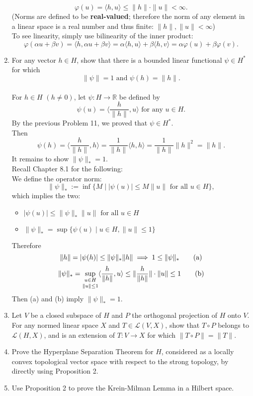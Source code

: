\begin{enumerate}
    \[
        \varphi(u)=\langle h,u\rangle\le\|h\|\cdot\|u\|<\infty.
    \]
    (Norms are defined to be \textbf{real-valued}; therefore the norm of any element in a linear space is a real number and thus finite: $\|h\|,\|u\|<\infty$)
    \\To see linearity, simply use bilinearity of the inner product:
    \[
        \varphi(\alpha u+\beta v)=\langle h,\alpha u+\beta v\rangle=\alpha\langle h,u\rangle+\beta\langle h,v\rangle=\alpha\varphi(u)+\beta\varphi(v).
    \]
    \item For any vector $h\in H$, show that there is a bounded linear functional $\psi\in H^*$ for which 
    \[
        \|\psi\|=1\text{ and }\psi(h)=\|h\|.  
    \]
    \\For $h\in H$ $(h\neq0)$, let $\psi:H\to\mathbb{R}$ be defined by 
    \[
        \psi(u)=\langle \frac{h}{\|h\|},u\rangle\text{ for any }u\in H.
    \]
    By the previous Problem 11, we proved that $\psi\in H^*$.
    \\Then 
    \[
        \psi(h)=\langle \frac{h}{\|h\|},h\rangle=\frac{1}{\|h\|}\langle h,h\rangle=\frac{1}{\|h\|}\|h\|^2=\|h\|.
    \]
    It remains to show $\|\psi\|_*=1$.
    \\Recall Chapter 8.1 for the following:
    \\We define the operator norm:
    \[
        \|\psi\|_*:=\inf\{M\mid|\psi(u)|\le M\|u\|\text{ for all }u\in H\},
    \]
    which implies the two: 
    \begin{itemize}
        \item $|\psi(u)|\le \|\psi\|_*\|u\|\text{ for all }u\in H$
        \item $\|\psi\|_*=\sup\{\psi(u)\mid u\in H, \|u\|\le1\}$
    \end{itemize}
    Therefore
    \[
        \|h\|=|\psi(h)|\le \|\psi\|_*\|h\|\implies 1\le \|\psi\|_*\tag{\text{a}}
    \]
    \[
        \|\psi\|_*=\underset{\|u\|\le1}{\underset{u\in H}{\sup}}\langle \frac{h}{\|h\|},u\rangle\le \|\frac{h}{\|h\|}\|\cdot\|u\|\le1\tag{\text{b}}
    \]
    Then (a) and (b) imply $\|\psi\|_*=1$.
    \item Let $V$ be a closed subspace of $H$ and $P$ the orthogonal projection of $H$ onto $V$.
    For any normed linear space $X$ and $T\in\mathcal{L}(V,X)$, show that $T\circ P$ belongs to $\mathcal{L}(H,X)$, and is an extension of $T:V\to X$ for which $\|T\circ P\|=\|T\|$.
    \item Prove the Hyperplane Separation Theorem for $H$, considered as a locally convex topological vector space with respect to the strong topology, by directly using Proposition 2.
    \item Use Proposition 2 to prove the Krein-Milman Lemma in a Hilbert space.
\end{enumerate}

